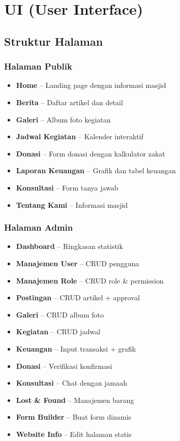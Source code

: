 \documentclass[12pt,a4paper]{article}
\begin{document}
\newpage

\section{UI (User Interface)}

\subsection{Struktur Halaman}

\subsubsection{Halaman Publik}
\begin{itemize}
    \item \textbf{Home} -- Landing page dengan informasi masjid
    \item \textbf{Berita} -- Daftar artikel dan detail
    \item \textbf{Galeri} -- Album foto kegiatan
    \item \textbf{Jadwal Kegiatan} -- Kalender interaktif
    \item \textbf{Donasi} -- Form donasi dengan kalkulator zakat
    \item \textbf{Laporan Keuangan} -- Grafik dan tabel keuangan
    \item \textbf{Konsultasi} -- Form tanya jawab
    \item \textbf{Tentang Kami} -- Informasi masjid
\end{itemize}

\subsubsection{Halaman Admin}
\begin{itemize}
    \item \textbf{Dashboard} -- Ringkasan statistik
    \item \textbf{Manajemen User} -- CRUD pengguna
    \item \textbf{Manajemen Role} -- CRUD role \& permission
    \item \textbf{Postingan} -- CRUD artikel + approval
    \item \textbf{Galeri} -- CRUD album foto
    \item \textbf{Kegiatan} -- CRUD jadwal
    \item \textbf{Keuangan} -- Input transaksi + grafik
    \item \textbf{Donasi} -- Verifikasi konfirmasi
    \item \textbf{Konsultasi} -- Chat dengan jamaah
    \item \textbf{Lost \& Found} -- Manajemen barang
    \item \textbf{Form Builder} -- Buat form dinamis
    \item \textbf{Website Info} -- Edit halaman statis
\end{itemize}
\end{document}
